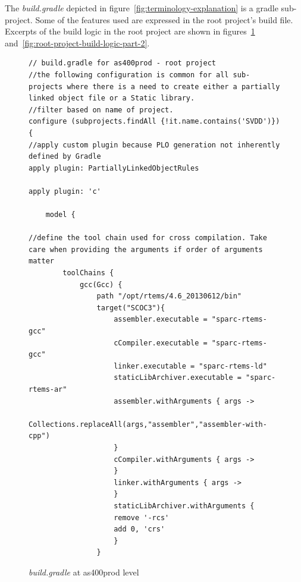 \documentclass[12pt, a4paper, titlepage]{scrartcl}
\newcommand{\courierword}[1]{\textsf{\itshape #1}}{\fontfamily{pcr}\selectfont}%
\begin{document}
\par The \courierword{build.gradle} depicted in figure~\ref{fig:terminology-explanation} is a gradle sub-project. Some of the features used are expressed in the root project's build file. Excerpts of the build logic in the root project are shown in figures~\ref{fig:root-project-build-logic-part-1} and~\ref{fig:root-project-build-logic-part-2}. 
\begin{figure}[!ht]
\begin{lstlisting}[frame=single]
// build.gradle for as400prod - root project
//the following configuration is common for all sub-projects where there is a need to create either a partially linked object file or a Static library.
//filter based on name of project.
configure (subprojects.findAll {!it.name.contains('SVDD')}) {
//apply custom plugin because PLO generation not inherently defined by Gradle
apply plugin: PartiallyLinkedObjectRules

apply plugin: 'c'

	model {

//define the tool chain used for cross compilation. Take care when providing the arguments if order of arguments matter	
		toolChains {
			gcc(Gcc) {
				path "/opt/rtems/4.6_20130612/bin"
				target("SCOC3"){
					assembler.executable = "sparc-rtems-gcc"
					cCompiler.executable = "sparc-rtems-gcc"
					linker.executable = "sparc-rtems-ld"
					staticLibArchiver.executable = "sparc-rtems-ar"				
					assembler.withArguments { args ->
						Collections.replaceAll(args,"assembler","assembler-with-cpp")
					}				
					cCompiler.withArguments { args ->
					}
					linker.withArguments { args ->
					}
					staticLibArchiver.withArguments { 
					remove '-rcs'
					add 0, 'crs'
					}
				}
\end{lstlisting}
\caption{\courierword{build.gradle} at as400prod level}
\label{fig:root-project-build-logic-part-1}
\end{figure}
\end{document}
